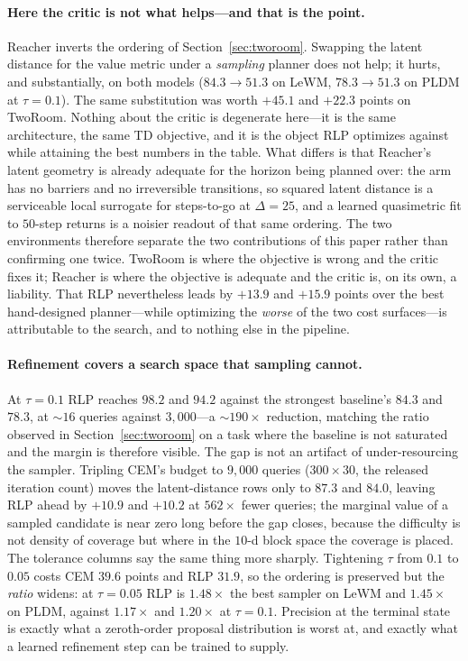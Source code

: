 \paragraph{Here the critic is not what helps---and that is the point.}
Reacher inverts the ordering of Section~\ref{sec:tworoom}. Swapping the latent
distance for the value metric under a \emph{sampling} planner does not help; it
hurts, and substantially, on both models ($84.3 \to 51.3$ on LeWM,
$78.3 \to 51.3$ on PLDM at $\tau = 0.1$). The same substitution was worth
$+45.1$ and $+22.3$ points on TwoRoom. Nothing about the critic is degenerate
here---it is the same architecture, the same TD objective, and it is the object
RLP optimizes against while attaining the best numbers in the table. What
differs is that Reacher's latent geometry is already adequate for the horizon
being planned over: the arm has no barriers and no irreversible transitions, so
squared latent distance is a serviceable local surrogate for steps-to-go at
$\Delta = 25$, and a learned quasimetric fit to $50$-step returns is a noisier
readout of that same ordering. The two environments therefore separate the two
contributions of this paper rather than confirming one twice. TwoRoom is where
the objective is wrong and the critic fixes it; Reacher is where the objective
is adequate and the critic is, on its own, a liability. That RLP nevertheless
leads by $+13.9$ and $+15.9$ points over the best hand-designed planner---while
optimizing the \emph{worse} of the two cost surfaces---is attributable to the
search, and to nothing else in the pipeline.

\paragraph{Refinement covers a search space that sampling cannot.}
At $\tau = 0.1$ RLP reaches $98.2$ and $94.2$ against the strongest baseline's
$84.3$ and $78.3$, at ${\sim}16$ queries against $3{,}000$---a
${\sim}190\times$ reduction, matching the ratio observed in
Section~\ref{sec:tworoom} on a task where the baseline is not saturated and the
margin is therefore visible. The gap is not an artifact of under-resourcing the
sampler. Tripling CEM's budget to $9{,}000$ queries ($300 \times 30$, the
released iteration count) moves the latent-distance rows only to $87.3$ and
$84.0$, leaving RLP ahead by $+10.9$ and $+10.2$ at $562\times$ fewer queries;
the marginal value of a sampled candidate is near zero long before the gap
closes, because the difficulty is not density of coverage but where in the
$10$-d block space the coverage is placed. The tolerance columns say the same
thing more sharply. Tightening $\tau$ from $0.1$ to $0.05$ costs CEM $39.6$
points and RLP $31.9$, so the ordering is preserved but the \emph{ratio} widens:
at $\tau = 0.05$ RLP is $1.48\times$ the best sampler on LeWM and $1.45\times$
on PLDM, against $1.17\times$ and $1.20\times$ at $\tau = 0.1$. Precision at the
terminal state is exactly what a zeroth-order proposal distribution is worst at,
and exactly what a learned refinement step can be trained to supply.

